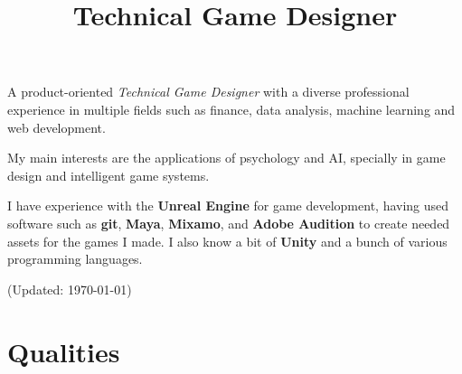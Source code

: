 \documentclass[11pt,a4paper]{moderncv}
\title{Technical Game Designer}               %
\begin{document}
\maketitle

A product-oriented \textit{Technical Game Designer} with a diverse professional experience in multiple fields such as finance, data analysis, machine learning and web development. 

My main interests are the applications of psychology and AI, specially in game design and intelligent game systems.

I have experience with the \textbf{Unreal Engine} for game development, having used software such as \textbf{git}, \textbf{Maya}, \textbf{Mixamo}, and \textbf{Adobe Audition} to create needed assets for the games I made. I also know a bit of \textbf{Unity} and a bunch of various programming languages.

(Updated: \today)

\section{Qualities}
\end{document}
